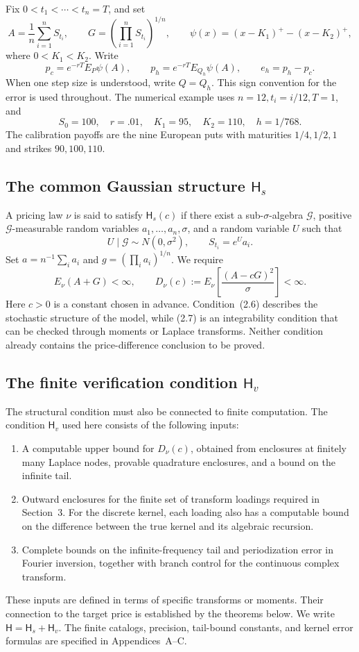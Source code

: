 Fix \(0<t_1<\cdots<t_n=T\), and set
\[
A=\frac1n\sum_{i=1}^nS_{t_i},\qquad
G=\left(\prod_{i=1}^nS_{t_i}\right)^{1/n},\qquad
\psi(x)=(x-K_1)^+-(x-K_2)^+,
\tag{2.3}
\]
where \(0<K_1<K_2\). Write
\[
p_c=e^{-rT}E_P\psi(A),\qquad
p_h=e^{-rT}E_{Q_h}\psi(A),\qquad e_h=p_h-p_c.
\tag{2.4}
\]
When one step size is understood, write \(Q=Q_h\). This sign convention for the error is used throughout. The numerical example uses \(n=12,t_i=i/12,T=1\), and
\[
S_0=100,\quad r=.01,\quad K_1=95,\quad K_2=110,\quad h=1/768.
\tag{2.5}
\]
The calibration payoffs are the nine European puts with maturities \(1/4,1/2,1\) and strikes \(90,100,110\).

\subsection{The common Gaussian structure \(\mathsf H_s\)}

A pricing law \(\nu\) is said to satisfy \(\mathsf H_s(c)\) if there exist a sub-\(\sigma\)-algebra \(\mathcal G\), positive \(\mathcal G\)-measurable random variables \(a_1,\ldots,a_n,\sigma\), and a random variable \(U\) such that
\[
U\mid\mathcal G\sim N(0,\sigma^2),\qquad S_{t_i}=e^Ua_i.
\tag{2.6}
\]
Set \(a=n^{-1}\sum_i a_i\) and \(g=(\prod_i a_i)^{1/n}\). We require
\[
E_\nu(A+G)<\infty,\qquad
D_\nu(c):=E_\nu\!\left[\frac{(A-cG)^2}{\sigma}\right]<\infty.
\tag{2.7}
\]
Here \(c>0\) is a constant chosen in advance. Condition~(2.6) describes the stochastic structure of the model, while (2.7) is an integrability condition that can be checked through moments or Laplace transforms. Neither condition already contains the price-difference conclusion to be proved.

\subsection{The finite verification condition \(\mathsf H_v\)}

The structural condition must also be connected to finite computation. The condition \(\mathsf H_v\) used here consists of the following inputs:
\begin{enumerate}
\item A computable upper bound for \(D_\nu(c)\), obtained from enclosures at finitely many Laplace nodes, provable quadrature enclosures, and a bound on the infinite tail.
\item Outward enclosures for the finite set of transform loadings required in Section~3. For the discrete kernel, each loading also has a computable bound on the difference between the true kernel and its algebraic recursion.
\item Complete bounds on the infinite-frequency tail and periodization error in Fourier inversion, together with branch control for the continuous complex transform.
\end{enumerate}
These inputs are defined in terms of specific transforms or moments. Their connection to the target price is established by the theorems below. We write
\(\mathsf H=\mathsf H_s+\mathsf H_v\).
The finite catalogs, precision, tail-bound constants, and kernel error formulas are specified in Appendices~A--C.

